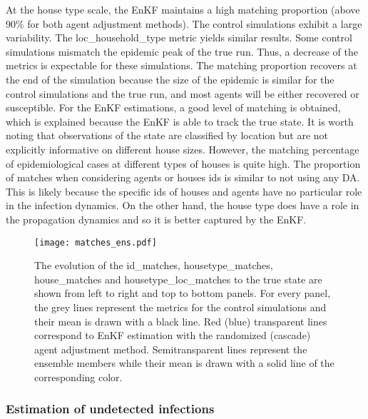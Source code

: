 \documentclass[11pt,a4paper]{article}
\begin{document}
At the house type scale, the EnKF maintains a high matching proportion (above 90\% for both agent adjustment methods). The control simulations exhibit a large variability. The loc\_household\_type metric yields similar results. Some control simulations mismatch the epidemic peak of the true run. Thus, a decrease of the metrics is expectable for these simulations. The matching proportion recovers at the end of the simulation because the size of the epidemic is similar for the control simulations and the true run, and most agents will be either recovered or susceptible. For the EnKF estimations, a good level of matching is obtained, which is explained because the EnKF is able to track the true state. It is worth noting that observations of the state are classified by location but are not explicitly informative on different house sizes. However, the matching percentage of epidemiological cases at different types of houses is quite high. The proportion of matches when considering agents or houses ids is similar to not using any DA. This is likely because the specific ids of houses and agents have no particular role in the infection dynamics. On the other hand, the house type does have a role in the propagation dynamics and so it is better captured by the EnKF.

\begin{figure}
    \captionsetup{width=0.5\textwidth}
    \centering
    \texttt{[image: matches\_ens.pdf]}
    \caption{The evolution of the id\_matches, housetype\_matches, house\_matches and housetype\_loc\_matches to the true state are shown from left to right and top to bottom panels. For every panel, the grey lines represent the metrics for the control simulations and their mean is drawn with a black line. Red (blue) transparent lines correspond to EnKF estimation with the randomized (cascade) agent adjustment method. Semitransparent lines represent the ensemble members while their mean is drawn with a solid line of the corresponding color.}
    \label{fig:matches}
\end{figure}

\subsubsection{Estimation of undetected infections} \label{sec:asymptomatic}
\end{document}
